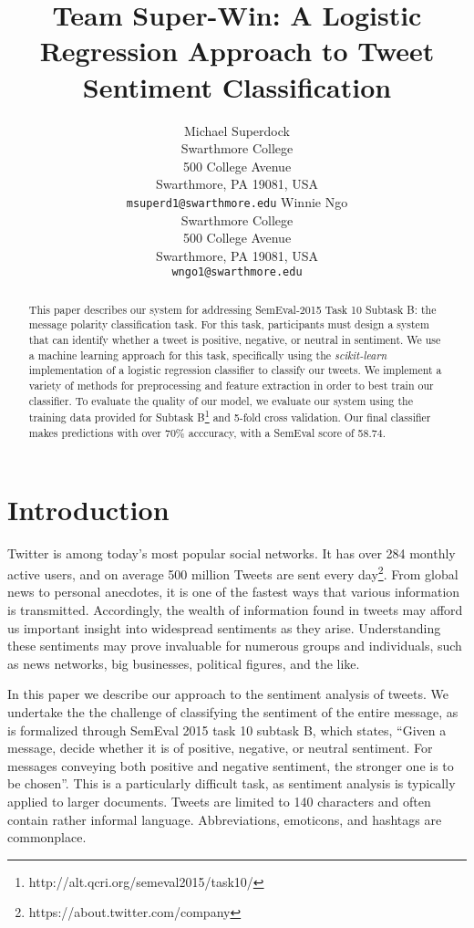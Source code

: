 \documentclass[11pt,letterpaper]{article}
\title{Team Super-Win: A Logistic Regression Approach to Tweet Sentiment Classification}
\author{Michael Superdock\\
	    Swarthmore College\\
	    500 College Avenue\\
	    Swarthmore, PA 19081, USA\\
	    {\tt msuperd1@swarthmore.edu}
	  \And
	Winnie Ngo\\
  	Swarthmore College\\
  	500 College Avenue\\
  	Swarthmore, PA 19081, USA\\
  {\tt wngo1@swarthmore.edu}}
\date{}
\begin{document}
\maketitle
\begin{abstract}

  This paper describes our system for addressing SemEval-2015 Task 10 Subtask B: the message polarity classification task. For this task, participants must design a system that can identify whether a tweet is positive, negative, or neutral in sentiment. We use a machine learning approach for this task, specifically using the \emph{scikit-learn} implementation of a logistic regression classifier to classify our tweets. We implement a variety of methods for preprocessing and feature extraction in order to best train our classifier. To evaluate the quality of our model, we evaluate our system using the training data provided for Subtask B\footnote{http://alt.qcri.org/semeval2015/task10/} and 5-fold cross validation. Our final classifier makes predictions with over 70\% acccuracy, with a SemEval score of 58.74.

\end{abstract}

\section{Introduction}


Twitter is among today's most popular social networks. It has over 284 monthly active users, and on average 500 million Tweets are sent every day\footnote{https://about.twitter.com/company}. From global news to personal anecdotes, it is one of the fastest ways that various information is transmitted. Accordingly, the wealth of information found in tweets may afford us important insight into widespread sentiments as they arise. Understanding these sentiments may prove invaluable for numerous groups and individuals, such as news networks, big businesses, political figures, and the like.

In this paper we describe our approach to the sentiment analysis of tweets. We undertake the the challenge of classifying the sentiment of the entire message, as is formalized through SemEval 2015 task 10 subtask B, which states, ``Given a message, decide whether it is of positive, negative, or neutral sentiment. For messages conveying both positive and negative sentiment, the stronger one is to be chosen''\cite{rosenthal-EtAl:2014:SemEval}. This is a particularly difficult task, as sentiment analysis is typically applied to larger documents. Tweets are limited to 140 characters and often contain rather informal language. Abbreviations, emoticons, and hashtags are commonplace. 
\end{document}
